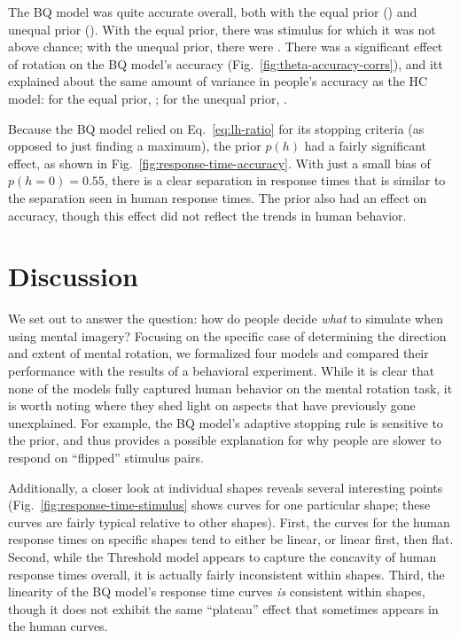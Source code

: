 \documentclass[10pt,letterpaper]{article}
\newcommand{\Th}[0]{Threshold}
\newcommand{\Hc}[0]{HC}
\newcommand{\Bq}[0]{BQ}
\begin{document}
The \Bq{} model was quite accurate overall, both with the equal prior
(\BqAccuracy{}) and unequal prior (\BqpAccuracy{}). With the equal
prior, there was \BqNumChance{} stimulus for which it was not above
chance; with the unequal prior, there were \BqpNumChance{}. There was
a significant effect of rotation on the \Bq{} model's accuracy
(Fig.~\ref{fig:theta-accuracy-corrs}), and itt explained about the
same amount of variance in people's accuracy as the \Hc{} model: for
the equal prior, \BqAccuracyCorr{}; for the unequal prior,
\BqpAccuracyCorr{}.

Because the \Bq{} model relied on Eq.~\ref{eq:lh-ratio} for its
stopping criteria (as opposed to just finding a maximum), the prior
$p(h)$ had a fairly significant effect, as shown in
Fig.~\ref{fig:response-time-accuracy}. With just a small bias of
$p(h=0)=0.55$, there is a clear separation in response times that is
similar to the separation seen in human response times. The prior also
had an effect on accuracy, though this effect did not reflect the
trends in human behavior.

\section{Discussion}

We set out to answer the question: how do people decide \textit{what}
to simulate when using mental imagery? Focusing on the specific case
of determining the direction and extent of mental rotation, we
formalized four models and compared their performance with the results
of a behavioral experiment. While it is clear that none of the models
fully captured human behavior on the mental rotation task, it is worth
noting where they shed light on aspects that have previously gone
unexplained.  For example, the \Bq{} model's adaptive stopping rule is
sensitive to the prior, and thus provides a possible explanation for
why people are slower to respond on ``flipped'' stimulus pairs.

Additionally, a closer look at individual shapes reveals several
interesting points (Fig.~\ref{fig:response-time-stimulus} shows curves
for one particular shape; these curves are fairly typical relative to
other shapes). First, the curves for the human response times on
specific shapes tend to either be linear, or linear first, then
flat. Second, while the \Th{} model appears to capture the concavity
of human response times overall, it is actually fairly inconsistent
within shapes. Third, the linearity of the \Bq{} model's response time
curves \textit{is} consistent within shapes, though it does not
exhibit the same ``plateau'' effect that sometimes appears in the
human curves.
\end{document}
